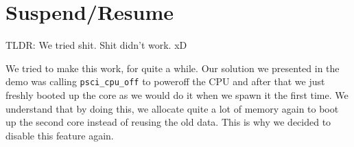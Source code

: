 \section{Suspend/Resume}

TLDR: We tried shit. Shit didn't work. xD

We tried to make this work, for quite a while. Our solution we presented in the demo was calling \texttt{psci_cpu_off} to poweroff the CPU and after that we just freshly booted up the core as we would do it when we spawn it the first time. We understand that by doing this, we allocate quite a lot of memory again to boot up the second core instead of reusing the old data. This is why we decided to disable this feature again.
